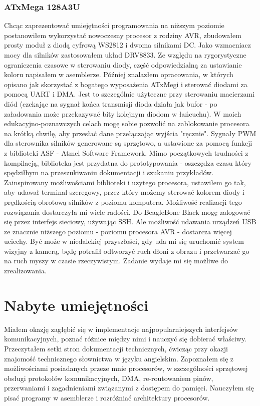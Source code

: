 \documentclass[a4paper]{article}
\begin{document}
\subsubsection{ATxMega 128A3U}
Chcąc zaprezentować umiejętności programowania na niższym poziomie postanowiłem wykorzystać nowoczesny procesor z rodziny AVR, zbudowałem prosty moduł z diodą cyfrową WS2812 i dwoma silnikami DC. Jako wzmacniacz mocy dla silników zastosowałem układ DRV8833. Ze względu na rygorystyczne ograniczenia czasowe w sterowaniu diody, część odpowiedzialną za ustawianie koloru napisałem w asemblerze. Później znalazłem opracowania, w których opisano jak skorzystać z bogatego wyposażenia ATxMegi i sterować diodami za pomocą UART i DMA. Jest to szczególnie użyteczne przy sterowaniu macierzami diód (czekając na sygnał końca transmisji dioda działa jak bufor - po załadowania może przekazywać bity kolejnym diodom w łańcuchu). W moich edukacyjno-poznawczych celach mogę sobie pozwolić na zablokowanie procesora na krótką chwilę, aby przesłać dane przełączając wyjścia "ręcznie". Sygnały PWM dla sterownika silników generowane są sprzętowo, a ustawione za pomocą funkcji z biblioteki ASF - Atmel Software Framework. Mimo początkowych trudności z kompilacją, biblioteka jest przydatna do prototypowania - oszczędza czasu który spędziłbym na przeszukiwaniu dokumentacji i szukaniu przykładów. Zainspirowany możliwościami biblioteki i uzytego procesora, ustawiłem go tak, aby udawał terminal szeregowy, przez który możemy sterować kolorem diody i prędkością obrotową silników z poziomu komputera. Możliwość realizacji tego rozwiązania dostarczyła mi wiele radości. Do BeagleBone Black mogę zalogować się przez interfejs sieciowy, używając SSH. Ale możliwość udawania urządzeń USB ze znacznie niższego poziomu - poziomu procesora AVR - dostarcza więcej uciechy. Być może w niedalekiej przyszłości, gdy uda mi się uruchomić system wizyjny z kamerą, będę potrafił odtworzyć ruch dłoni z obrazu i przetwarzać go na ruch myszy w czasie rzeczywistym. Zadanie wydaje mi się możliwe do zrealizowania.
\section{Nabyte umiejętności}
Miałem okazję zagłębić się w implementacje najpopularniejszych interfejsów komunikacyjnych, poznać różnice między nimi i nauczyć się dobierać właściwy. Przeczytałem setki stron dokumentacji technicznych, ćwicząc przy okazji znajomość technicznego słownictwa w języku angielskim. Zapoznałem się z możliwościami posiadanych przeze mnie procesorów, w szczególności sprzętowej obsługi protokołów komunikacyjnych, DMA, re-routowaniem pinów, przerwaniami i zagadnieniami związanymi z dostępem do pamięci. Nauczyłem się pisać programy w asemblerze i rozróżniać architektury procesorów. 
\end{document}
